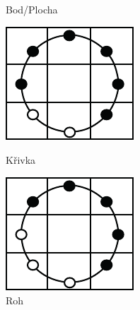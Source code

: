 \begin{figure}[H]
\begin{minipage}[b]{.18\textwidth}
  \caption*{Bod/Plocha}
\end{minipage}
\begin{minipage}[b]{.18\textwidth}
  \centering
  \includegraphics[width=.9\linewidth]{assets/9_lbp_line}
  \caption*{Křivka}
\end{minipage}
\begin{minipage}[b]{.18\textwidth}
  \centering
  \includegraphics[width=.9\linewidth]{assets/9_lbp_corner}
  \caption*{Roh}
\end{minipage}
\begin{minipage}[b]{.18\textwidth}
  \centering

\end{minipage}
\end{figure}
